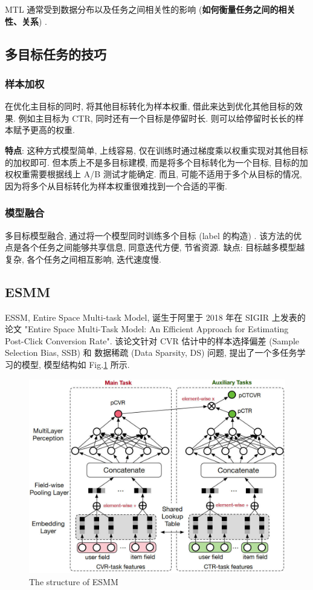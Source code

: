 MTL 通常受到数据分布以及任务之间相关性的影响 (\textbf{如何衡量任务之间的相关性、关系}) . 

\subsection{多目标任务的技巧}
\subsubsection{样本加权}
在优化主目标的同时, 将其他目标转化为样本权重, 借此来达到优化其他目标的效果. 例如主目标为 CTR, 同时还有一个目标是停留时长. 则可以给停留时长长的样本赋予更高的权重. 

\textbf{特点}: 这种方式模型简单, 上线容易, 仅在训练时通过梯度乘以权重实现对其他目标的加权即可. 但本质上不是多目标建模, 而是将多个目标转化为一个目标, 目标的加权权重需要根据线上 A/B 测试才能确定. 而且, 可能不适用于多个从目标的情况, 因为将多个从目标转化为样本权重很难找到一个合适的平衡. 

\subsubsection{模型融合}
多目标模型融合, 通过将一个模型同时训练多个目标 (label 的构造) . 该方法的优点是各个任务之间能够共享信息, 同意迭代方便, 节省资源. 缺点: 目标越多模型越复杂, 各个任务之间相互影响, 迭代速度慢. 


\subsection{ESMM}
ESSM, Entire Space Multi-task Model, 诞生于阿里于 2018 年在 SIGIR 上发表的论文 "Entire Space Multi-Task Model: An Efficient Approach for Estimating Post-Click Conversion Rate". 该论文针对 CVR 估计中的样本选择偏差 (Sample Selection Bias, SSB) 和 数据稀疏 (Data Sparsity, DS) 问题, 提出了一个多任务学习的模型, 模型结构如 Fig.\ref{fig:esmm} 所示.

\begin{figure}[h]
	\centering
	\includegraphics[width=\textwidth]{pics/esmm.jpg}
	\caption{The structure of ESMM}
	\label{fig:esmm}
\end{figure}

